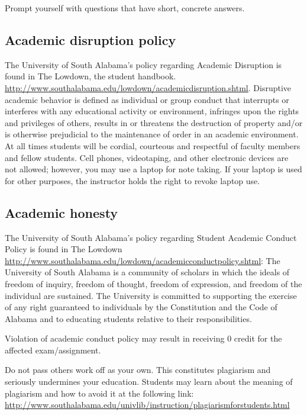 \documentclass[11pt,]{article}
\begin{document}
Prompt yourself with questions that have short, concrete answers.

\hypertarget{academic-disruption-policy}{%
\subsection{Academic disruption
policy}\label{academic-disruption-policy}}

The University of South Alabama's policy regarding Academic Disruption
is found in The Lowdown, the student handbook.
\url{http://www.southalabama.edu/lowdown/academicdisruption.shtml}.
Disruptive academic behavior is defined as individual or group conduct
that interrupts or interferes with any educational activity or
environment, infringes upon the rights and privileges of others, results
in or threatens the destruction of property and/or is otherwise
prejudicial to the maintenance of order in an academic environment. At
all times students will be cordial, courteous and respectful of faculty
members and fellow students. Cell phones, videotaping, and other
electronic devices are not allowed; however, you may use a laptop for
note taking. If your laptop is used for other purposes, the instructor
holds the right to revoke laptop use.

\hypertarget{academic-honesty}{%
\subsection{Academic honesty}\label{academic-honesty}}

The University of South Alabama's policy regarding Student Academic
Conduct Policy is found in The Lowdown
\url{http://www.southalabama.edu/lowdown/academicconductpolicy.shtml}:
The University of South Alabama is a community of scholars in which the
ideals of freedom of inquiry, freedom of thought, freedom of expression,
and freedom of the individual are sustained. The University is committed
to supporting the exercise of any right guaranteed to individuals by the
Constitution and the Code of Alabama and to educating students relative
to their responsibilities.

Violation of academic conduct policy may result in receiving 0 credit
for the affected exam/assignment.

Do not pass others work off as your own. This constitutes plagiarism and
seriously undermines your education. Students may learn about the
meaning of plagiarism and how to avoid it at the following link:
\url{http://www.southalabama.edu/univlib/instruction/plagiarismforstudents.html}
\end{document}
